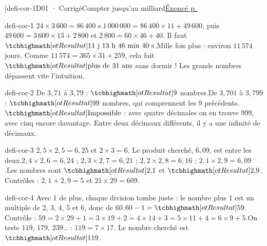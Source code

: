 \editionPage[\pdfbookmark[0]{Corrigés des défis}{bm-defi-cor-1-parent}]{defi-cor-1}{D01 · Corrigé}{Compter jusqu’au milliard}{\hyperref[defi-ex-1]{Énoncé p.\,\pageref*{defi-ex-1}}}
\begin{blocEdition}{defi-cor-1}
$24\times3\,600=86\,400$ s.$1\,000\,000=86\,400\times11+49\,600$, puis $49\,600=3\,600\times13+2\,800$ et $2\,800=60\times46+40$. Il faut $\res{11\text{ j }13\text{ h }46\text{ min }40\text{ s}}$.Mille fois plus : environ $11\,574$ jours. Comme $11\,574=365\times31+259$, cela fait $\res{\text{plus de 31 ans}}$ sans dormir ! Les grands nombres dépassent vite l’intuition.
\end{blocEdition}
\begin{blocEdition}{defi-cor-2}
De $3{,}71$ à $3{,}79$ : $\res9$ nombres.De $3{,}701$ à $3{,}799$ : $\res{99}$ nombres, qui comprennent les 9 précédents.$\res{\text{Impossible}}$ : avec quatre décimales on en trouve 999, avec cinq encore davantage. Entre deux décimaux différents, il y a une infinité de décimaux.
\end{blocEdition}
\begin{blocEdition}{defi-cor-3}
$2{,}5\times2{,}5=6{,}25$ et $2\times3=6$. Le produit cherché, $6{,}09$, est entre les deux.$2{,}4\times2{,}6=6{,}24$ ; $2{,}3\times2{,}7=6{,}21$ ; $2{,}2\times2{,}8=6{,}16$ ; $2{,}1\times2{,}9=6{,}09$.Les nombres sont $\res{2{,}1}$ et $\res{2{,}9}$. Contrôles : $2{,}1+2{,}9=5$ et $21\times29=609$.
\end{blocEdition}
\begin{blocEdition}{defi-cor-4}
Avec 1 de plus, chaque division tombe juste : le nombre plus 1 est un multiple de 2, 3, 4, 5 et 6, donc de 60.$60-1=\res{59}$. Contrôle : $59=2\times29+1=3\times19+2=4\times14+3=5\times11+4=6\times9+5$.On teste $119$, $179$, $239$… : $119=7\times17$. Le nombre cherché est $\res{119}$.
\end{blocEdition}
